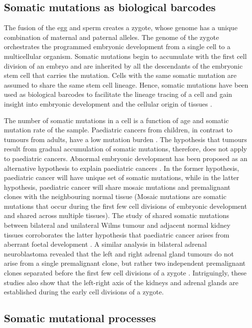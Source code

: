 \subsection{Somatic mutations as biological barcodes}

The fusion of the egg and sperm creates a zygote, whose genome has a unique combination of maternal and paternal alleles. The genome of the zygote orchestrates the programmed embryonic development from a single cell to a multicellular organism. Somatic mutations begin to accumulate with the first cell division of an embryo and are inherited by all the descendants of the embryonic stem cell that carries the mutation. Cells with the same somatic mutation are assumed to share the same stem cell lineage. Hence, somatic mutations have been used as biological barcodes to facilitate the lineage tracing of a cell and gain insight into embryonic development and the cellular origin of tissues \cite{Behjati2014-gb}. 

The number of somatic mutations in a cell is a function of age and somatic mutation rate of the sample. Paediatric cancers from children, in contrast to tumours from adults, have a low mutation burden \cite{Grobner2018-ve}. The hypothesis that tumours result from gradual accumulation of somatic mutations, therefore, does not apply to paediatric cancers. Abnormal embryonic development has been proposed as an alternative hypothesis to explain paediatric cancers \cite{Marshall2014-ec}. In the former hypothesis, paediatric cancer will have unique set of somatic mutations, while in the latter hypothesis, paediatric cancer will share mosaic mutations and premalignant clones with the neighbouring normal tissue (Mosaic mutations are somatic mutations that occur during the first few cell divisions of embryonic development and shared across multiple tissues). The study of shared somatic mutations between bilateral and unilateral Wilms tumour and adjacent normal kidney tissues corroborates the latter hypothesis that paediatric cancer arises from aberrant foetal development \cite{Coorens2019-zf}. A similar analysis in bilateral adrenal neuroblastoma revealed that the left and right adrenal gland tumours do not arise from a single premalignant clone, but rather two independent premalignant clones separated before the first few cell divisions of a zygote \cite{Coorens2020-ut}. Intriguingly, these studies also show that the left-right axis of the kidneys and adrenal glands are established during the early cell divisions of a zygote. 


\subsection{Somatic mutational processes}

